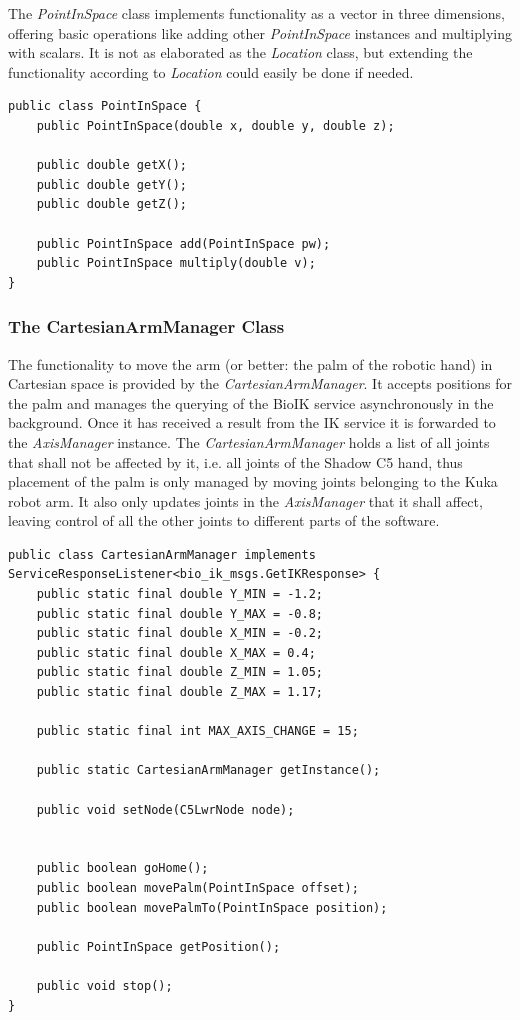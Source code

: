 The \textit{PointInSpace} class implements functionality as a vector in three dimensions, offering basic operations like adding other \textit{PointInSpace} instances and multiplying with scalars. It is not as elaborated as the \textit{Location} class, but extending the functionality according to \textit{Location} could easily be done if needed.

\begin{lstlisting}[caption={The public interface of PointInSpace}]
public class PointInSpace {
	public PointInSpace(double x, double y, double z);
	
	public double getX();
	public double getY();
	public double getZ();
	
	public PointInSpace add(PointInSpace pw);
	public PointInSpace multiply(double v);
}

\end{lstlisting}

\subsubsection{The CartesianArmManager Class}

The functionality to move the arm (or better: the palm of the robotic hand) in Cartesian space is provided by the \textit{CartesianArmManager}. It accepts positions for the palm and manages the querying of the BioIK service asynchronously in the background. Once it has received a result from the IK service it is forwarded to the \textit{AxisManager} instance. The \textit{CartesianArmManager} holds a list of all joints that shall not be affected by it, i.e. all joints of the Shadow C5 hand, thus placement of the palm is only managed by moving joints belonging to the Kuka robot arm. It also only updates joints in the \textit{AxisManager} that it shall affect, leaving control of all the other joints to different parts of the software.

\begin{lstlisting}[caption={The public interface of CartesianArmManager}, label=lst:impl:cartarm]
public class CartesianArmManager implements ServiceResponseListener<bio_ik_msgs.GetIKResponse> {
	public static final double Y_MIN = -1.2;
	public static final double Y_MAX = -0.8;
	public static final double X_MIN = -0.2;
	public static final double X_MAX = 0.4;
	public static final double Z_MIN = 1.05;
	public static final double Z_MAX = 1.17;
	
	public static final int MAX_AXIS_CHANGE = 15;
	
	public static CartesianArmManager getInstance();
	
	public void setNode(C5LwrNode node);
	
	
	public boolean goHome();
	public boolean movePalm(PointInSpace offset);
	public boolean movePalmTo(PointInSpace position);
	
	public PointInSpace getPosition();
	
	public void stop();
}
\end{lstlisting}

